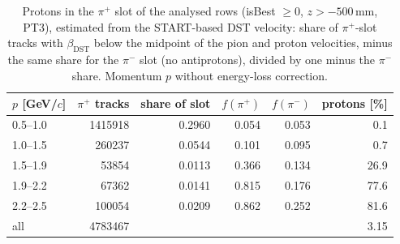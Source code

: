 \begin{table}[H]
\centering
\caption{Protons in the $\pi^+$ slot of the analysed rows (isBest $\geq 0$, $z>-500$\,mm, PT3), estimated from the START-based DST velocity: share of $\pi^+$-slot tracks with $\beta_{\mathrm{DST}}$ below the midpoint of the pion and proton velocities, minus the same share for the $\pi^-$ slot (no antiprotons), divided by one minus the $\pi^-$ share. Momentum $p$ without energy-loss correction.}
\label{tab:pid_pip_protons}
\footnotesize
\begin{tabular}{@{}l r r r r r@{}}
\toprule
$p$ [GeV/$c$] & $\pi^+$ tracks & share of slot & $f(\pi^+)$ & $f(\pi^-)$ & protons [\%] \\
\midrule
0.5--1.0 & 1415918 & 0.2960 & 0.054 & 0.053 & 0.1 \\
1.0--1.5 & 260237 & 0.0544 & 0.101 & 0.095 & 0.7 \\
1.5--1.9 & 53854 & 0.0113 & 0.366 & 0.134 & 26.9 \\
1.9--2.2 & 67362 & 0.0141 & 0.815 & 0.176 & 77.6 \\
2.2--2.5 & 100054 & 0.0209 & 0.862 & 0.252 & 81.6 \\
\midrule
all & 4783467 & & & & 3.15 \\
\bottomrule
\end{tabular}
\end{table}
